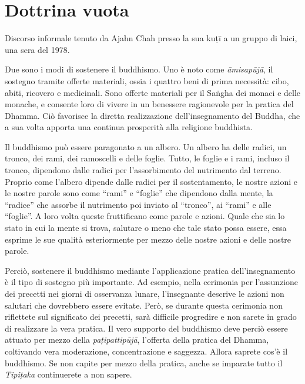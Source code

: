 \chapter{Dottrina vuota}

\begin{openingQuote}
  Discorso informale tenuto da Ajahn Chah presso la sua kuṭī a un gruppo
  di laici, una sera del 1978.
\end{openingQuote}

Due sono i modi di sostenere il buddhismo. Uno è noto come
\emph{āmisapūjā}, il sostegno tramite offerte materiali, ossia i quattro
beni di prima necessità: cibo, abiti, ricovero e medicinali. Sono
offerte materiali per il Saṅgha dei monaci e delle monache, e consente
loro di vivere in un benessere ragionevole per la pratica del Dhamma.
Ciò favorisce la diretta realizzazione dell'insegnamento del Buddha, che
a sua volta apporta una continua prosperità alla religione buddhista.

Il buddhismo può essere paragonato a un albero. Un albero ha delle
radici, un tronco, dei rami, dei ramoscelli e delle foglie. Tutto, le
foglie e i rami, incluso il tronco, dipendono dalle radici per
l'assorbimento del nutrimento dal terreno. Proprio come l'albero
dipende dalle radici per il sostentamento, le nostre azioni e le nostre
parole sono come ``rami'' e ``foglie'' che dipendono dalla mente, la
``radice'' che assorbe il nutrimento poi inviato al ``tronco'', ai
``rami'' e alle ``foglie''. A loro volta queste fruttificano come parole
e azioni. Quale che sia lo stato in cui la mente si trova, salutare o
meno che tale stato possa essere, essa esprime le sue qualità
esteriormente per mezzo delle nostre azioni e delle nostre parole.

Perciò, sostenere il buddhismo mediante l'applicazione pratica
dell'insegnamento è il tipo di sostegno più importante. Ad esempio,
nella cerimonia per l'assunzione dei precetti nei giorni di osservanza
lunare, l'insegnante descrive le azioni non salutari che dovrebbero
essere evitate. Però, se durante questa cerimonia non riflettete sul
significato dei precetti, sarà difficile progredire e non sarete in
grado di realizzare la vera pratica. Il vero supporto del buddhismo deve
perciò essere attuato per mezzo della \emph{paṭipattipūjā}, l'offerta
della pratica del Dhamma, coltivando vera moderazione, concentrazione e
saggezza. Allora saprete cos'è il buddhismo. Se non capite per mezzo
della pratica, anche se imparate tutto il \emph{Tipiṭaka} continuerete a
non sapere.

